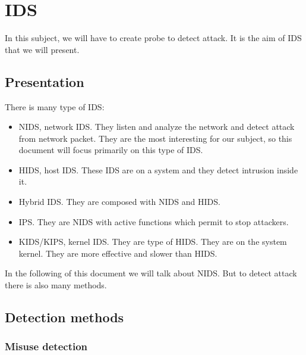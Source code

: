 \chapter{IDS}

In this subject, we will have to create probe to detect attack. It is the aim of IDS that we will present.

\section{Presentation}




There is many type of IDS:
\begin{itemize}
\item NIDS, network IDS. They listen and analyze the network and detect attack from network packet. They are the
  most interesting for our subject, so this document will focus primarily on this type of IDS.
\item HIDS, host IDS. These IDS are on a system and they detect intrusion inside it.
\item Hybrid IDS. They are composed with NIDS and HIDS.
\item IPS. They are NIDS with active functions which permit to stop attackers.
\item KIDS/KIPS, kernel IDS. They are type of HIDS. They are on the system kernel. They are more effective and
slower than HIDS.
\end{itemize}

In the following of this document we will talk about NIDS. But to detect attack there is also many methods.


\section{Detection methods}

\subsection{Misuse detection}

